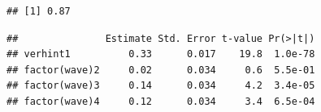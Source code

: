 \documentclass[
]{book}
\newenvironment{Shaded}{\begin{snugshade}}{\end{snugshade}}
\newcommand{\CommentTok}[1]{\textcolor[rgb]{0.56,0.35,0.01}{\textit{#1}}}
\newcommand{\DataTypeTok}[1]{\textcolor[rgb]{0.13,0.29,0.53}{#1}}
\newcommand{\KeywordTok}[1]{\textcolor[rgb]{0.13,0.29,0.53}{\textbf{#1}}}
\newcommand{\NormalTok}[1]{#1}
\newcommand{\OperatorTok}[1]{\textcolor[rgb]{0.81,0.36,0.00}{\textbf{#1}}}
\newcommand{\StringTok}[1]{\textcolor[rgb]{0.31,0.60,0.02}{#1}}
\begin{document}
\begin{verbatim}
## [1] 0.87
\end{verbatim}

\begin{Shaded}
\end{Shaded}

\begin{verbatim}
##               Estimate Std. Error t-value Pr(>|t|)
## verhint1          0.33      0.017    19.8  1.0e-78
## factor(wave)2     0.02      0.034     0.6  5.5e-01
## factor(wave)3     0.14      0.034     4.2  3.4e-05
## factor(wave)4     0.12      0.034     3.4  6.5e-04
\end{verbatim}

  
\end{document}
